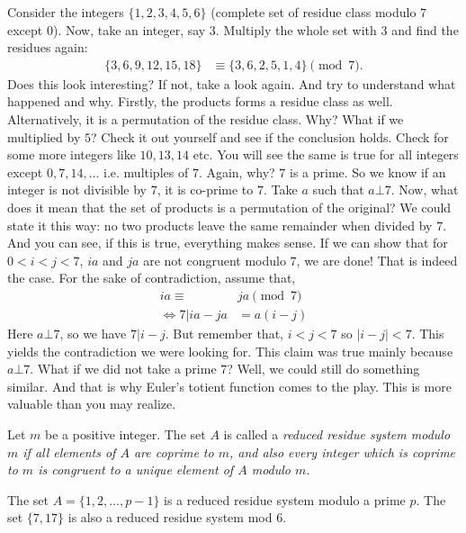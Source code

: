 \documentclass{subfile}
\begin{document}
	Consider the integers $\{1,2,3,4,5,6\}$ (complete set of residue class modulo $7$ except $0$). Now, take an integer, say $3$. Multiply the whole set with $3$ and find the residues again:
		\begin{align*}
			\{3,6,9,12,15,18\} & \equiv\{3,6,2,5,1,4\}\pmod7.
		\end{align*}
	Does this look interesting? If not, take a look again. And try to understand what happened and why. Firstly, the products forms a residue class as well. Alternatively, it is a permutation of the residue class. Why? What if we multiplied by $5$? Check it out yourself and see if the conclusion holds. Check for some more integers like $10, 13,14$ etc. You will see the same is true for all integers except $0,7,14,\ldots$ i.e. multiples of $7$. Again, why? $7$ is a prime. So we know if an integer is not divisible by $7$, it is co-prime to $7$. Take $a$ such that $a\bot7$. Now, what does it mean that the set of products is a permutation of the original? We could state it this way: no two products leave the same remainder when divided by $7$. And you can see, if this is true, everything makes sense. If we can show that for $0<i<j<7$, $ia$ and $ja$ are not congruent modulo $7$, we are done! That is indeed the case. For the sake of contradiction, assume that,
		\begin{align*}
			ia  \equiv &ja\pmod7\\
			\iff 7|ia-ja&=a(i-j)
		\end{align*}
	Here $a\bot7$, so we have $7|i-j$. But remember that, $i<j<7$ so $|i-j|<7$. This yields the contradiction we were looking for. This claim was true mainly because $a\bot7$. What if we did not take a prime $7$? Well, we could still do something similar. And that is why Euler's totient function comes to the play. This is more valuable than you may realize.
	
	\begin{definition}
		Let $m$ be a positive integer. The set $A$ is called a \slshape{reduced residue system modulo $m$} if all elements of $A$ are coprime to $m$, and also every integer which is coprime to $m$ is congruent to a unique element of $A$ modulo $m$.
	\end{definition}
	
	\begin{example}
		The set $A=\{ 1, 2, \ldots, p-1 \}$ is a reduced residue system modulo a prime $p$. The set $\{7, 17\}$ is also a reduced residue system mod $6$.
	\end{example}
	
\end{document}
